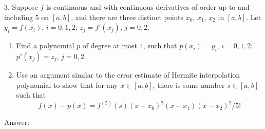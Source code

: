 \documentclass[20pt]{article} %
\theoremstyle{break}
\begin{document}
3. Suppose $f$ is continuous and with continuous derivatives of order up to and including 5 on $[a, b]$, and there are three distinct points $x_0$, $x_1$, $x_2$ in $[a, b]$. Let $y_i=f(x_i)$, $i=0, 1, 2$; $z_j=f'(x_j)$, $j=0, 2$.
\begin{enumerate}
\item Find a polynomial $p$ of degree at most $4$, such that $p(x_i)=y_i$, $i=0, 1, 2$; $p'(x_j)=z_j$, $j=0, 2$.
\item Use an argument similar to the error estimate of Hermite interpolation polynomial to show that for any $x\in [a, b]$, there is some number $s\in [a, b]$ such that
  \[f(x)-p(x)=f^{(5)}(s)(x-x_0)^2(x-x_1)(x-x_2)^2/5!\]
\end{enumerate}

Answer:\\
\end{document}
